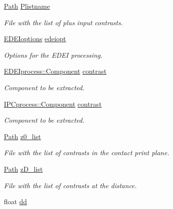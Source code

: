 \begin{DoxyCompactItemize}
\hyperlink{classPath}{Path} \hyperlink{structclargs_ad5975cc5573e851686be6a5863a2f953}{Plistname}
\begin{DoxyCompactList}\small\item\em File with the list of plus input contrasts. \item\end{DoxyCompactList}\item 
\hyperlink{structEDEIoptions}{EDEIoptions} \hyperlink{structclargs_aea1c39f22a21c69fbd90af6bcae1744d}{edeiopt}
\begin{DoxyCompactList}\small\item\em Options for the EDEI processing. \item\end{DoxyCompactList}\item 
\hyperlink{classEDEIprocess_a745d55d7f97f3aafa52998d49d9acde4}{EDEIprocess::Component} \hyperlink{structclargs_a71dfcd38ac63faa44de57ebfd34bac17}{contrast}
\begin{DoxyCompactList}\small\item\em Component to be extracted. \item\end{DoxyCompactList}\item 
\hyperlink{classIPCprocess_a9e159369437f40cc3340171a0f6d3418}{IPCprocess::Component} \hyperlink{structclargs_a0653caf3cc562b9859564416bcc4f786}{contrast}
\begin{DoxyCompactList}\small\item\em Component to be extracted. \item\end{DoxyCompactList}\item 
\hyperlink{classPath}{Path} \hyperlink{structclargs_ab0312c400b7341a6a9449cacf948487e}{z0\_\-list}
\begin{DoxyCompactList}\small\item\em File with the list of contrasts in the contact print plane. \item\end{DoxyCompactList}\item 
\hyperlink{classPath}{Path} \hyperlink{structclargs_a8d1b356aa854d772d99d7e8560fd46d4}{zD\_\-list}
\begin{DoxyCompactList}\small\item\em File with the list of contrasts at the distance. \item\end{DoxyCompactList}\item 
float \hyperlink{structclargs_a4c19429952a40f11a48647d667a18592}{dd}

\end{DoxyCompactItemize}
